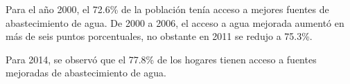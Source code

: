 Para el año 2000, el 72.6\% de la población tenía acceso a mejores fuentes de abastecimiento de agua. De 2000 a 2006, el acceso a agua mejorada aumentó en  más de seis puntos porcentuales, no obstante en 2011 se redujo a 75.3\%. 

Para 2014, se observó que el 77.8\% de los hogares tienen acceso a fuentes mejoradas de abastecimiento de agua.